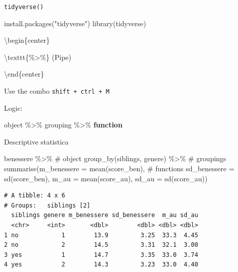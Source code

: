 \documentclass[
  ignorenonframetext,
]{beamer}
\newenvironment{Shaded}{\begin{snugshade}}{\end{snugshade}}
\newcommand{\AttributeTok}[1]{\textcolor[rgb]{0.00,0.34,0.68}{#1}}
\newcommand{\CommentTok}[1]{\textcolor[rgb]{0.54,0.53,0.53}{#1}}
\newcommand{\ControlFlowTok}[1]{\textcolor[rgb]{0.12,0.11,0.11}{\textbf{#1}}}
\newcommand{\FunctionTok}[1]{\textcolor[rgb]{0.39,0.29,0.61}{#1}}
\newcommand{\NormalTok}[1]{\textcolor[rgb]{0.12,0.11,0.11}{#1}}
\newcommand{\SpecialCharTok}[1]{\textcolor[rgb]{0.24,0.68,0.91}{#1}}
\newcommand{\StringTok}[1]{\textcolor[rgb]{0.75,0.01,0.01}{#1}}
\begin{document}
\begin{frame}[fragile]{\texttt{tidyverse()}}
\protect\hypertarget{tidyverse}{}
\begin{Shaded}
\begin{Highlighting}[]
\FunctionTok{install.packages}\NormalTok{(}\StringTok{"tidyverse"}\NormalTok{)}
\FunctionTok{library}\NormalTok{(tidyverse)}
\end{Highlighting}
\end{Shaded}

\pause

\textbackslash begin\{center\}

\textbackslash texttt\{\%\textgreater\%\} (Pipe)

\textbackslash end\{center\}

Use the combo \texttt{shift\ +\ ctrl\ +\ M}

Logic:

\begin{Shaded}
\begin{Highlighting}[]
\NormalTok{object }\SpecialCharTok{\%\textgreater{}\%}  
\NormalTok{  grouping }\SpecialCharTok{\%\textgreater{}\%} 
  \ControlFlowTok{function}
\end{Highlighting}
\end{Shaded}
\end{frame}

\begin{frame}[fragile]{Descriptive statistica}
\protect\hypertarget{descriptive-statistica}{}
\begin{Shaded}
\begin{Highlighting}[]
\NormalTok{benessere }\SpecialCharTok{\%\textgreater{}\%}  \CommentTok{\# object}
  \FunctionTok{group\_by}\NormalTok{(siblings, genere) }\SpecialCharTok{\%\textgreater{}\%}  \CommentTok{\# groupings}
  \FunctionTok{summarise}\NormalTok{(}\AttributeTok{m\_benessere =} \FunctionTok{mean}\NormalTok{(score\_ben),  }\CommentTok{\# functions}
            \AttributeTok{sd\_benessere =} \FunctionTok{sd}\NormalTok{(score\_ben), }
            \AttributeTok{m\_au =} \FunctionTok{mean}\NormalTok{(score\_au), }
            \AttributeTok{sd\_au =} \FunctionTok{sd}\NormalTok{(score\_au))}
\end{Highlighting}
\end{Shaded}

\begin{verbatim}
# A tibble: 4 x 6
# Groups:   siblings [2]
  siblings genere m_benessere sd_benessere  m_au sd_au
  <chr>     <int>       <dbl>        <dbl> <dbl> <dbl>
1 no            1        13.9         3.25  33.3  4.45
2 no            2        14.5         3.31  32.1  3.00
3 yes           1        14.7         3.35  33.0  3.74
4 yes           2        14.3         3.23  33.0  4.40
\end{verbatim}
\end{frame}
\end{document}
